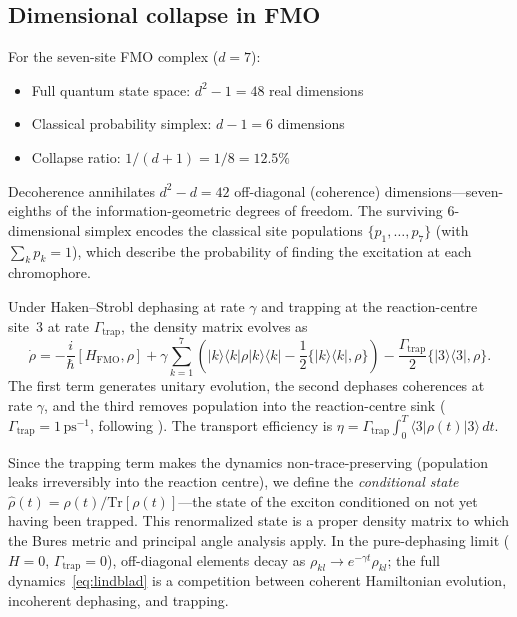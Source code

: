 \documentclass[12pt,a4paper]{article}
\theoremstyle{definition}
\theoremstyle{remark}
\begin{document}
\subsection{Dimensional collapse in FMO}
\label{sec:fmo-collapse}

For the seven-site FMO complex ($d = 7$):
\begin{itemize}
\item Full quantum state space: $d^2 - 1 = 48$ real dimensions
\item Classical probability simplex: $d - 1 = 6$ dimensions
\item Collapse ratio: $1/(d+1) = 1/8 = 12.5\%$
\end{itemize}
Decoherence annihilates $d^2 - d = 42$ off-diagonal (coherence) dimensions---seven-eighths of the information-geometric degrees of freedom. The surviving 6-dimensional simplex encodes the classical site populations $\{p_1, \ldots, p_7\}$ (with $\sum_k p_k = 1$), which describe the probability of finding the excitation at each chromophore.

Under Haken--Strobl dephasing \cite{haken1973exactly} at rate $\gamma$ and trapping at the reaction-centre site~3 at rate $\Gamma_{\mathrm{trap}}$, the density matrix evolves as
\begin{equation}
\label{eq:lindblad}
\dot{\rho} = -\frac{i}{\hbar}[H_{\mathrm{FMO}}, \rho] + \gamma \sum_{k=1}^7 \left(|k\rangle\langle k| \rho |k\rangle\langle k| - \frac{1}{2}\{|k\rangle\langle k|, \rho\}\right) - \frac{\Gamma_{\mathrm{trap}}}{2}\{|3\rangle\langle 3|, \rho\}.
\end{equation}
The first term generates unitary evolution, the second dephases coherences at rate $\gamma$, and the third removes population into the reaction-centre sink ($\Gamma_{\mathrm{trap}} = 1\,\mathrm{ps}^{-1}$, following \cite{rebentrost2009environment}). The transport efficiency is $\eta = \Gamma_{\mathrm{trap}} \int_0^T \langle 3|\rho(t)|3\rangle\,dt$.

Since the trapping term makes the dynamics non-trace-preserving (population leaks irreversibly into the reaction centre), we define the \emph{conditional state} $\hat{\rho}(t) = \rho(t)/\mathrm{Tr}[\rho(t)]$---the state of the exciton conditioned on not yet having been trapped. This renormalized state is a proper density matrix to which the Bures metric and principal angle analysis apply. In the pure-dephasing limit ($H = 0$, $\Gamma_{\mathrm{trap}} = 0$), off-diagonal elements decay as $\rho_{kl} \to e^{-\gamma t}\rho_{kl}$; the full dynamics~\eqref{eq:lindblad} is a competition between coherent Hamiltonian evolution, incoherent dephasing, and trapping.
\end{document}
